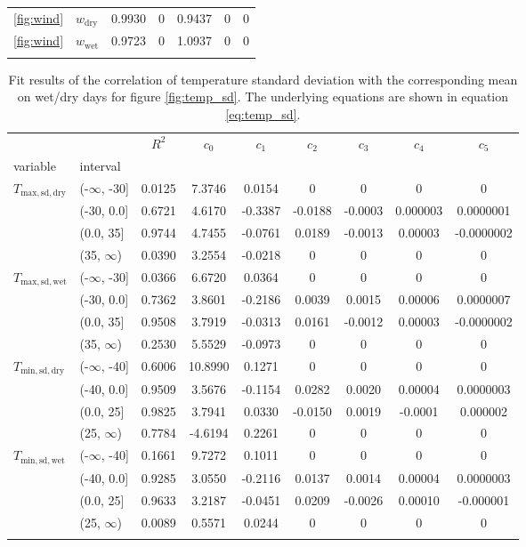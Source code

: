 \begin{refsection}
\begin{table}[t]
\begin{tabular}{llccccc}
		\ref{fig:wind} &  $w_{\mathrm{dry}}$ & 0.9930 & 0 & 0.9437 & 0 & 0 \\
		\ref{fig:wind} &  $w_{\mathrm{wet}}$ & 0.9723 & 0 & 1.0937 & 0 & 0 \\
		\bottomhline
	\end{tabular}
\end{table}
\begin{table}[t]
	\caption[Fit results of the correlation of temperature standard deviation with the mean.]{Fit results of the correlation of temperature standard deviation with the corresponding mean on wet/dry days for figure \ref{fig:temp_sd}. The underlying equations are shown in equation \eqref{eq:temp_sd}.}
	\label{tab:t-sd-corr}
	\begin{tabular}{llccccccc}
		\tophline
		&            &  $R^2$ &   $c_0$ &   $c_1$ &   $c_2$ &   $c_3$ &    $c_4$ &      $c_5$ \\
		variable & interval &        &         &         &         &         &          &            \\
		\middlehline
		$T_{\mathrm{max}, \mathrm{sd}, \mathrm{dry}}$ & (-$\infty$, -30] & 0.0125 & 7.3746 & 0.0154 & 0 & 0 & 0 & 0 \\
		& (-30, 0.0] & 0.6721 & 4.6170 & -0.3387 & -0.0188 & -0.0003 & 0.000003 & 0.0000001 \\
		& (0.0, 35] & 0.9744 & 4.7455 & -0.0761 & 0.0189 & -0.0013 & 0.00003 & -0.0000002 \\
		& (35, $\infty$) & 0.0390 & 3.2554 & -0.0218 & 0 & 0 & 0 & 0 \\
		$T_{\mathrm{max}, \mathrm{sd}, \mathrm{wet}}$ & (-$\infty$, -30] & 0.0366 & 6.6720 & 0.0364 & 0 & 0 & 0 & 0 \\
		& (-30, 0.0] & 0.7362 & 3.8601 & -0.2186 & 0.0039 & 0.0015 & 0.00006 & 0.0000007 \\
		& (0.0, 35] & 0.9508 & 3.7919 & -0.0313 & 0.0161 & -0.0012 & 0.00003 & -0.0000002 \\
		& (35, $\infty$) & 0.2530 & 5.5529 & -0.0973 & 0 & 0 & 0 & 0 \\
		$T_{\mathrm{min}, \mathrm{sd}, \mathrm{dry}}$ & (-$\infty$, -40] & 0.6006 & 10.8990 & 0.1271 & 0 & 0 & 0 & 0 \\
		& (-40, 0.0] & 0.9509 & 3.5676 & -0.1154 & 0.0282 & 0.0020 & 0.00004 & 0.0000003 \\
		& (0.0, 25] & 0.9825 & 3.7941 & 0.0330 & -0.0150 & 0.0019 & -0.0001 & 0.000002 \\
		& (25, $\infty$) & 0.7784 & -4.6194 & 0.2261 & 0 & 0 & 0 & 0 \\
		$T_{\mathrm{min}, \mathrm{sd}, \mathrm{wet}}$ & (-$\infty$, -40] & 0.1661 & 9.7272 & 0.1011 & 0 & 0 & 0 & 0 \\
		& (-40, 0.0] & 0.9285 & 3.0550 & -0.2116 & 0.0137 & 0.0014 & 0.00004 & 0.0000003 \\
		& (0.0, 25] & 0.9633 & 3.2187 & -0.0451 & 0.0209 & -0.0026 & 0.00010 & -0.000001 \\
		& (25, $\infty$) & 0.0089 & 0.5571 & 0.0244 & 0 & 0 & 0 & 0 \\
		\bottomhline
	\end{tabular}
\end{table}


\end{refsection}
